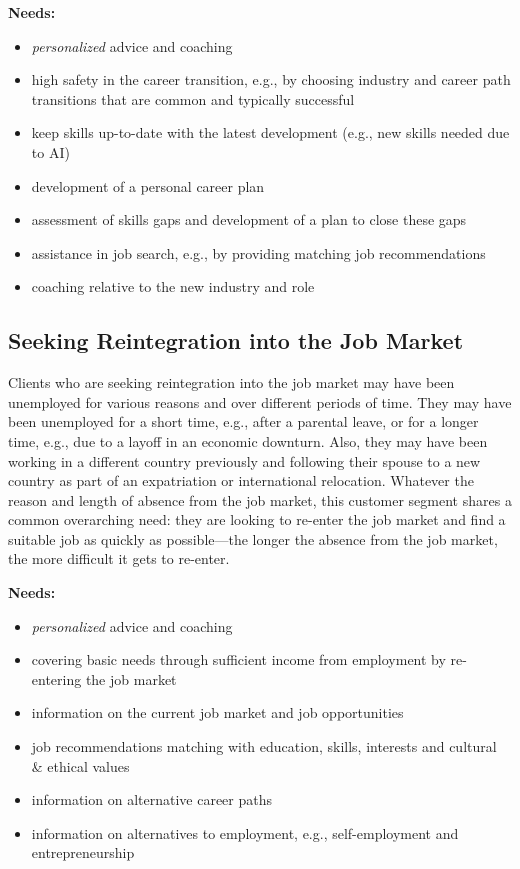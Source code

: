 \noindent\textbf{Needs:}
\begin{itemize}
    \item \textit{personalized} advice and coaching
    \item high safety in the career transition, e.g., by choosing industry and career path transitions that are common
        and typically successful
    \item keep skills up-to-date with the latest development (e.g., new skills needed due to AI)
    \item development of a personal career plan
    \item assessment of skills gaps and development of a plan to close these gaps
    \item assistance in job search, e.g., by providing matching job recommendations
    \item coaching relative to the new industry and role
\end{itemize}
\vspace*{0.1cm} 

\subsection{Seeking Reintegration into the Job Market}

Clients who are seeking reintegration into the job market may have been unemployed for various reasons and over
different periods of time. They may have been unemployed for a short time, e.g., after a parental leave, or for
a longer time, e.g., due to a layoff in an economic downturn. Also, they may have been working in a different
country previously and following their spouse to a new country as part of an expatriation or international
relocation. Whatever the reason and length of absence from the job market, this customer segment shares a
common overarching need: they are looking to re-enter the job market and find a suitable job as quickly as
possible---the longer the absence from the job market, the more difficult it gets to re-enter.
\newline

\noindent\textbf{Needs:}
\begin{itemize}
    \item \textit{personalized} advice and coaching
    \item covering basic needs through sufficient income from employment by re-entering the job market
    \item information on the current job market and job opportunities
    \item job recommendations matching with education, skills, interests and cultural \& ethical values
    \item information on alternative career paths
    \item information on alternatives to employment, e.g., self-employment and entrepreneurship
\end{itemize}

